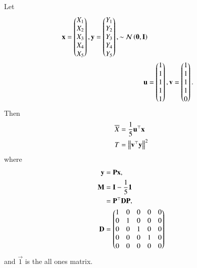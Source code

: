 \begin{lemma}
    \label{gauss/3/xy}
Let 
\begin{align}
    \mathbf{x}=\begin{pmatrix}X_1\\
             X_2\\
             X_3\\
             X_4\\
             X_5\end{pmatrix}
, 
             \mathbf{y}=\begin{pmatrix}Y_1\\
             Y_2\\
             Y_3\\
             Y_4\\
             Y_5\end{pmatrix}, 
             \sim \mathcal{N}\left({\mathbf{0}}, {\mathbf{I}} \right)
             \\
    \mathbf{u}&=\begin{pmatrix}1\\ 1\\ 1\\ 1\\ 1\end{pmatrix}, 
    \mathbf{v}=\begin{pmatrix}1\\ 1\\ 1\\ 1\\ 0\end{pmatrix}.
\end{align} 
%
Then 
\begin{align}
    \overline{X}&=\frac{1}{5}\mathbf{u}^{\top}\mathbf{x}
    \\
    T &= \left\lVert\mathbf{v}^{\top}\mathbf{y}\right\rVert^2
    \label{gauss/3/T}
\end{align}
where
\begin{align}
\mathbf{y} &= \mathbf{P}\mathbf{x}, 
\\
\mathbf{M} &= \mathbf{I}- \frac{1}{5}\mathbf{1}
\\
&= \mathbf{P}^{\top}\mathbf{D}\mathbf{P}, 
\\
    \mathbf{D} &=\begin{pmatrix}1&0&0&0&0\\
                   0&1&0&0&0\\
                   0&0&1&0&0\\
                   0&0&0&1&0\\
                   0&0&0&0&0\end{pmatrix}
\end{align}
  and $\vec{1}$ is the all ones matrix.
\end{lemma}
